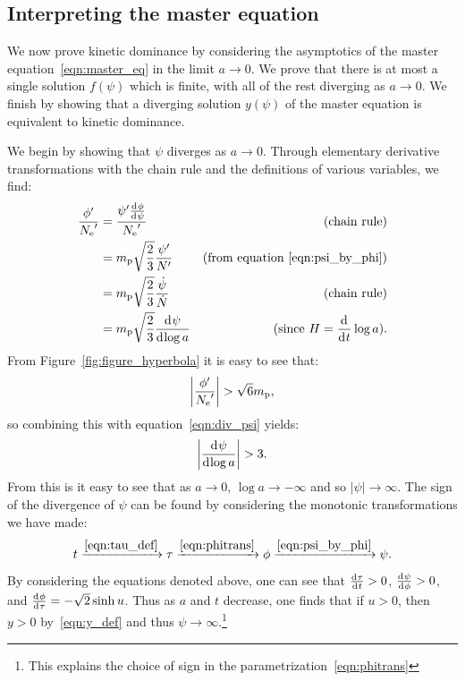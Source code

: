 \subsection{Interpreting the master equation}
\label{sec:interpreting_the_master_equation}

We now prove kinetic dominance by considering the asymptotics of the master equation~\eqref{eqn:master_eq} in the limit $a\rightarrow0$. We prove that there is at most a single solution $f(\psi)$ which is finite, with all of the rest diverging as $a\rightarrow0$. We finish by showing that a diverging solution $y(\psi)$ of the master equation is equivalent to kinetic dominance.

We begin by showing that $\psi$ diverges as $a\rightarrow0$. Through elementary derivative transformations with the chain rule and the definitions of various variables, we find:
%
\begin{align}
  \frac{{{\phi}^\prime}}{{{N_\mathrm{e}}^\prime}} 
  &=
  \frac{{{\psi}^\prime}\frac{\operatorname{d}^{}\!{\phi}}{\operatorname{d}^{}\!{\psi}}}{{{N_\mathrm{e}}^\prime}}
  &\text{(chain rule)} 
  \nonumber
  \\
  &=
  m_{\mathrm{p}}\sqrt{\frac{2}{3}}\frac{{{\psi}^\prime}}{{{N}^\prime}}  
  &\text{(from equation \protect\ref{eqn:psi_by_phi})} 
  \nonumber
  \\
  &=
  m_{\mathrm{p}}\sqrt{\frac{2}{3}}\frac{\dot\psi}{\dot{N}}  
  &\text{(chain rule)} 
  \nonumber
  \\
  &=
  m_{\mathrm{p}}\sqrt{\frac{2}{3}}\frac{\operatorname{d}^{}\!{\psi}}{\operatorname{d}^{}\!{\log a}}
  &\text{(since $H=\frac{\operatorname{d}^{}\!{}}{\operatorname{d}^{}\!{t}}\log a$)}.
  \label{eqn:div_psi}
\end{align}
%
From Figure~\ref{fig:figure_hyperbola} it is easy to see that:
%
\begin{equation}
  \left|\frac{{{\phi}^\prime}}{{{N_\mathrm{e}}^\prime}}\right| > \sqrt{6}m_{\mathrm{p}}, 
\end{equation}
%
so combining this with equation~\eqref{eqn:div_psi} yields:
%
\begin{equation}
  \left|\frac{\operatorname{d}^{}\!{\psi}}{\operatorname{d}^{}\!{\log a}}\right| > 3. 
\end{equation}
%
From this is it easy to see that as $a\to0$, $\log a\to-\infty$ and so $|\psi|\to\infty$. The sign of the divergence of $\psi$ can be found by considering the monotonic transformations we have made: %
\begin{equation}
  t
  \xrightarrow{\protect\eqref{eqn:tau_def}}
  \tau
  \xrightarrow{\protect\eqref{eqn:phitrans}}
  \phi
  \xrightarrow{\protect\eqref{eqn:psi_by_phi}}
  \psi.
\end{equation}
%
By considering the equations denoted above, one can see that $\frac{\operatorname{d}^{}\!{\tau}}{\operatorname{d}^{}\!{t}}>0$, $\frac{\operatorname{d}^{}\!{\psi}}{\operatorname{d}^{}\!{\phi}}>0$, and $\frac{\operatorname{d}^{}\!{\phi}}{\operatorname{d}^{}\!{\tau}} = -\sqrt{2}\sinh u$. Thus as $a$ and $t$ decrease, one finds that if $u>0$, then $y>0$ by~\eqref{eqn:y_def} and thus $\psi\to\infty$.\footnote{This explains the choice of sign in the parametrization~\protect\eqref{eqn:phitrans}}



